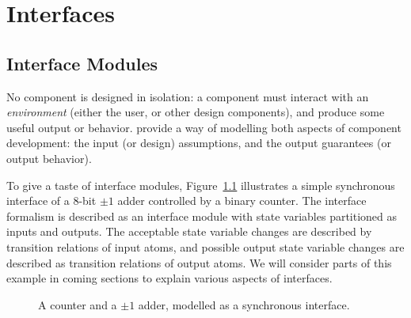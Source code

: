 \chapter{Interfaces}
\section{Interface Modules}
No component is designed in isolation: a component must interact
with an {\em environment\/} (either the user, or other design
components), and produce some useful output or behavior. {\im }
provide a way of modelling both aspects of component development:
the input (or design) assumptions, and the output guarantees (or
output behavior).


To give a taste of interface modules,
Figure~\ref{fig-counter} illustrates a simple synchronous
interface of a 8-bit $\pm 1$ adder controlled by a binary counter.
The interface formalism is described as an interface module with
state variables partitioned as inputs and outputs. The acceptable
state variable changes are described by transition relations of
input atoms, and possible output state variable changes are
described as transition relations of output atoms. We will
consider parts of this example in coming sections to explain
various aspects of interfaces.

\begin{figure}
\centering

\hspace{3em}

\caption{A counter and a $\pm 1$ adder, modelled as a synchronous
interface.} \label{fig-counter}
\end{figure}

